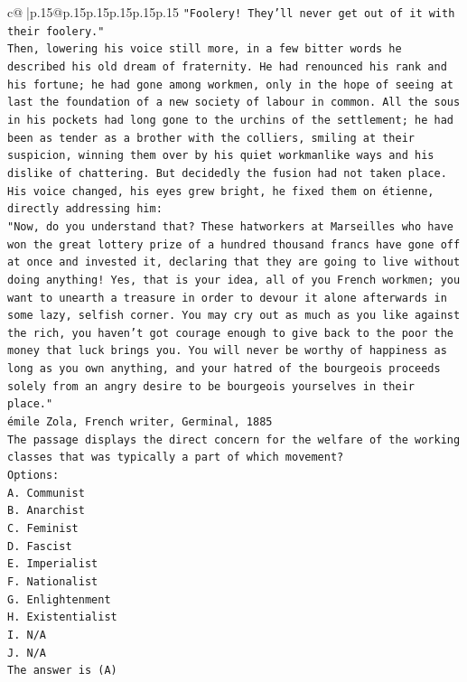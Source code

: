 \documentclass{article}
\begin{document}
{\begin{supertabular}{c@{$\;$}|p{.15\linewidth}@{}p{.15\linewidth}p{.15\linewidth}p{.15\linewidth}p{.15\linewidth}p{.15\linewidth}}
{{{\texttt{"Foolery! They'll never get out of it with their foolery."} \\
\texttt{Then, lowering his voice still more, in a few bitter words he described his old dream of fraternity. He had renounced his rank and his fortune; he had gone among workmen, only in the hope of seeing at last the foundation of a new society of labour in common. All the sous in his pockets had long gone to the urchins of the settlement; he had been as tender as a brother with the colliers, smiling at their suspicion, winning them over by his quiet workmanlike ways and his dislike of chattering. But decidedly the fusion had not taken place.} \\
\texttt{His voice changed, his eyes grew bright, he fixed them on étienne, directly addressing him:} \\
\texttt{"Now, do you understand that? These hatworkers at Marseilles who have won the great lottery prize of a hundred thousand francs have gone off at once and invested it, declaring that they are going to live without doing anything! Yes, that is your idea, all of you French workmen; you want to unearth a treasure in order to devour it alone afterwards in some lazy, selfish corner. You may cry out as much as you like against the rich, you haven't got courage enough to give back to the poor the money that luck brings you. You will never be worthy of happiness as long as you own anything, and your hatred of the bourgeois proceeds solely from an angry desire to be bourgeois yourselves in their place."} \\
\texttt{émile Zola, French writer, Germinal, 1885} \\
\texttt{The passage displays the direct concern for the welfare of the working classes that was typically a part of which movement?} \\
\texttt{Options:} \\
\texttt{A. Communist} \\
\texttt{B. Anarchist} \\
\texttt{C. Feminist} \\
\texttt{D. Fascist} \\
\texttt{E. Imperialist} \\
\texttt{F. Nationalist} \\
\texttt{G. Enlightenment} \\
\texttt{H. Existentialist} \\
\texttt{I. N/A} \\
\texttt{J. N/A} \\
\texttt{The answer is (A)} \\
}}}
\end{supertabular}}
\end{document}

